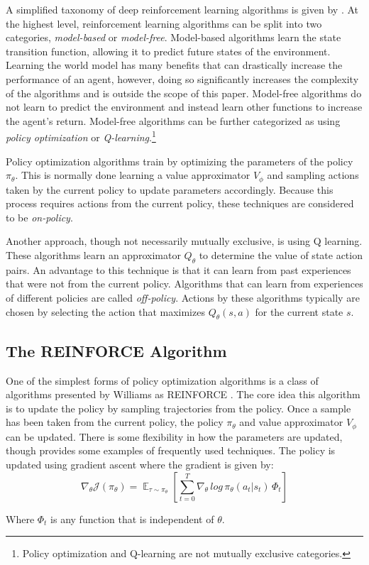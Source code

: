 \documentclass[conference]{IEEEtran}
\begin{document}
A simplified taxonomy of deep reinforcement learning algorithms is given by \cite{spinning_up_taxonomy}. At the highest level, reinforcement learning algorithms can be split into two categories, \textit{model-based} or \textit{model-free}. Model-based algorithms learn the state transition function, allowing it to predict future states of the environment. Learning the world model has many benefits that can drastically increase the performance of an agent, however, doing so significantly increases the complexity of the algorithms and is outside the scope of this paper. Model-free algorithms do not learn to predict the environment and instead learn other functions to increase the agent's return. Model-free algorithms can be further categorized as using \textit{policy optimization} or \textit{Q-learning}.\footnote{Policy optimization and Q-learning are not mutually exclusive categories.}

Policy optimization algorithms train by optimizing the parameters of the policy $\pi_\theta$. This is normally done learning a value approximator $V_\phi$ and sampling actions taken by the current policy to update parameters accordingly. Because this process requires actions from the current policy, these techniques are considered to be \textit{on-policy}.

Another approach, though not necessarily mutually exclusive, is using Q learning. These algorithms learn an approximator $Q_\theta$ to determine the value of state action pairs. An advantage to this technique is that it can learn from past experiences that were not from the current policy. Algorithms that can learn from experiences of different policies are called \textit{off-policy}. Actions by these algorithms typically are chosen by selecting the action that maximizes $Q_\theta(s, a)$ for the current state $s$.

\subsection{The REINFORCE Algorithm}

One of the simplest forms of policy optimization algorithms is a class of algorithms presented by Williams as REINFORCE \cite{REINFORCE}. The core idea this algorithm is to update the policy by sampling trajectories from the policy. Once a sample has been taken from the current policy, the policy $\pi_\theta$ and value approximator $V_\phi$ can be updated. There is some flexibility in how the parameters are updated, though \cite{spinning_up_policy_optimization} provides some examples of frequently used techniques. The policy is updated using gradient ascent where the gradient is given by:
$$
    \nabla_\theta\mathcal{J(\pi_\theta)} = \mathop{\mathbb{E}}_{\tau \sim \pi_\theta} \left[\sum_{t=0}^{T}\nabla_\theta \, log \, \pi_\theta(a_t | s_t) \, \Phi_t \right]
$$
\begin{flushleft}
    Where $\Phi_t$ is any function that is independent of $\theta$.
\end{flushleft}
\end{document}
